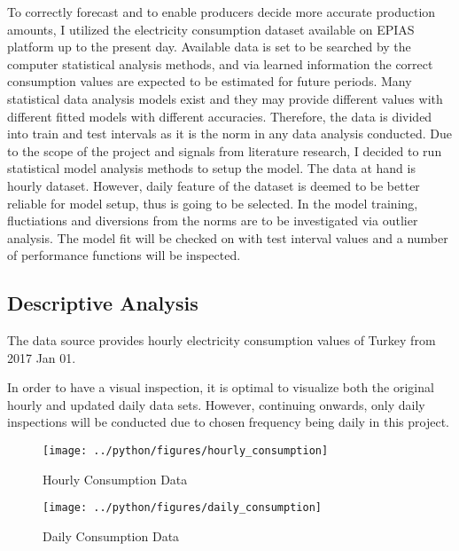 \documentclass[11pt, a4paper, leqno]{article}
\begin{document}
To correctly forecast and to enable producers decide more accurate production amounts, I utilized the electricity consumption dataset available on EPIAS platform up to the present day. Available data is set to be searched by the computer statistical analysis methods, and via learned information the correct consumption values are expected to be estimated for future periods.
Many statistical data analysis models exist and they may provide different values with different fitted models with different accuracies. Therefore, the data is divided into train and test intervals as it is the norm in any data analysis conducted.
Due to the scope of the project and signals from literature research, I decided to run statistical model analysis methods to setup the model.
The data at hand is hourly dataset. However, daily feature of the dataset is deemed to be better reliable for model setup, thus is going to be selected.
In the model training, fluctiations and diversions from the norms are to be investigated via outlier analysis.
The model fit will be checked on with test interval values and a number of performance functions will be inspected.

\subsection{Descriptive Analysis}
\label{subsec:descanalys}

The data source provides hourly electricity consumption values of Turkey from 2017 Jan 01.

In order to have a visual inspection, it is optimal to visualize both the original hourly and updated daily data sets. However, continuing onwards, only daily inspections will be conducted due to chosen frequency being daily in this project.

\begin{figure}[H]

    \centering
    \texttt{[image: ../python/figures/hourly\_consumption]}

    \caption{Hourly Consumption Data}
    \label{fig:hourly_consumption}

\end{figure}


\begin{figure}[H]

    \centering
    \texttt{[image: ../python/figures/daily\_consumption]}

    \caption{Daily Consumption Data}
    \label{fig:daily_consumption}

\end{figure}
\end{document}
